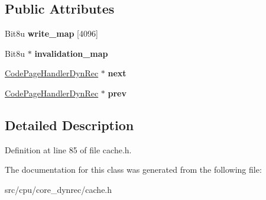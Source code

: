 \subsection*{Public Attributes}
\begin{DoxyCompactItemize}
\item 
\hypertarget{classCodePageHandlerDynRec_ac1d8018e02bcd95e91d5b606dba136af}{Bit8u {\bfseries write\-\_\-map} \mbox{[}4096\mbox{]}}\label{classCodePageHandlerDynRec_ac1d8018e02bcd95e91d5b606dba136af}

\item 
\hypertarget{classCodePageHandlerDynRec_a47aab5bb1199222974e7206325511bcb}{Bit8u $\ast$ {\bfseries invalidation\-\_\-map}}\label{classCodePageHandlerDynRec_a47aab5bb1199222974e7206325511bcb}

\item 
\hypertarget{classCodePageHandlerDynRec_a0d8b79c4e241f8f2527da02bd9d572ff}{\hyperlink{classCodePageHandlerDynRec}{Code\-Page\-Handler\-Dyn\-Rec} $\ast$ {\bfseries next}}\label{classCodePageHandlerDynRec_a0d8b79c4e241f8f2527da02bd9d572ff}

\item 
\hypertarget{classCodePageHandlerDynRec_a7a74ad368caacc487516a69ce33a6ef1}{\hyperlink{classCodePageHandlerDynRec}{Code\-Page\-Handler\-Dyn\-Rec} $\ast$ {\bfseries prev}}\label{classCodePageHandlerDynRec_a7a74ad368caacc487516a69ce33a6ef1}

\end{DoxyCompactItemize}


\subsection{Detailed Description}


Definition at line 85 of file cache.\-h.



The documentation for this class was generated from the following file\-:\begin{DoxyCompactItemize}
\item 
src/cpu/core\-\_\-dynrec/cache.\-h\end{DoxyCompactItemize}
